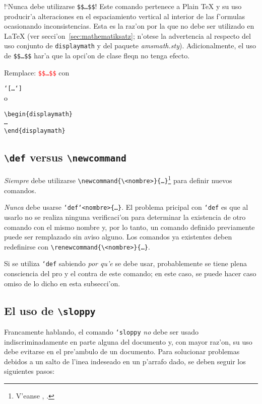 \documentclass[11pt,a4paper,pagesize,tablecaptionabove,abstracton,pointlessnumbers]{scrartcl}
\newcommand{\Paket}[1]{\textsf{\textsl{#1.sty}}\xspace}
\newcommand{\Option}[1]{\textsf{#1}\xspace}
\newcommand{\Env}[2]{\raggedright\texttt{\textbackslash begin\{#1\}\\
    #2\\ \textbackslash end\{#1\}}}
\newcommand{\NewCom}[3][]{\texttt{\textbackslash newcommand{#1}\{\textbackslash#2\}\{#3\}}}
\newcommand{\ReNewCom}[3][]{\texttt{\textbackslash renewcommand{#1}\{\textbackslash#2\}\{#3\}}}
\DeclareRobustCommand*{\Macro}[1]{\mbox{\texttt{\char`\\#1}}}
\DeclareRobustCommand*{\LMacro}[2]{\mbox{\texttt{\char`\\#1\{#2\}}}}
\newcommand{\Ersetze}[2]{\par\noindent Remplace: \textcolor{red}{#1}
  con \textcolor{gruen}{#2}}
\begin{document}
!`Nunca debe utilizarse \texttt{\$\$\dots\$\$}! Este comando pertenece a Plain \TeX{} y su uso producir'a alteraciones en el espaciamiento vertical al interior de las f'ormulas ocasionando inconsistencias. Esta es la raz'on por la que no debe ser utilizado en \LaTeX{} (ver secci'on~\vref{sec:mathematiksatz}; n'otese la advertencia al respecto del uso conjunto de \texttt{displaymath} y del paquete \Paket{amsmath}). Adicionalmente, el uso de \texttt{\$\$\dots\$\$} har'a que la opci'on de clase \Option{fleqn} no tenga efecto.

\Ersetze{\texttt{\$\$\dots\$\$}}{%
\parbox[t]{.3\textwidth}{%
\Macro{[}\texttt{\dots}\Macro{]}\\
\textcolor{black}{o}\\
\Env{displaymath}{\dots}}}

\subsection{\texttt{\textbackslash def} versus \texttt{\textbackslash newcommand}}
\label{sec:def-vs.-newcommand}

\emph{Siempre} debe utilizarse \NewCom{<nombre>}{\dots}\footnote{V'eanse \cite[secci'on 2.7.2]{clsguide}, \cite[secci'on 3.4]{usrguide}.} para definir nuevos comandos. 

\emph{Nunca} debe usarse \Macro{def}\LMacro{<nombre>}{\dots}. El problema pricipal con \Macro{def} es que al usarlo no se realiza ninguna verificaci'on para determinar la existencia de otro comando con el mismo nombre y, por lo tanto, un comando definido previamente puede ser remplazado sin aviso alguno. Los comandos ya existentes deben redefinirse con \ReNewCom{<nombre>}{\dots}.

Si se utiliza \Macro{def} sabiendo \emph{por qu'e} se debe usar, probablemente se tiene plena consciencia del pro y el contra de este comando; en este caso, se puede hacer caso omiso de lo dicho en esta subsecci'on.

\subsection{El uso de \texttt{\textbackslash sloppy}}
\label{sec:verw-von-textttt}

Francamente hablando, el comando \Macro{sloppy} \emph{no} debe ser usado indiscriminadamente en parte alguna del documento y, con mayor raz'on, su uso debe evitarse en el pre'ambulo de un documento. Para solucionar problemas debidos a un salto de l'inea indeseado en un p'arrafo dado, se deben seguir los siguientes pasos:
\end{document}
